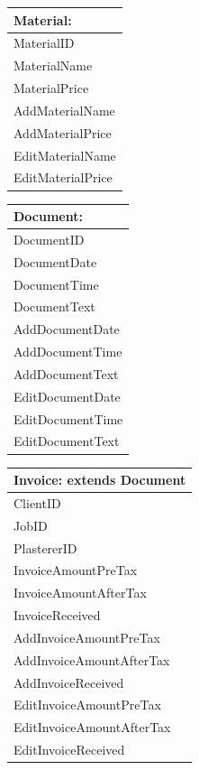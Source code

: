 \begin{tabular}{|p{5cm}|}
	\hline
	\textbf{Material:} \\ \hline
		MaterialID \\
		MaterialName \\
		MaterialPrice \\ \hline
		AddMaterialName\\
		AddMaterialPrice \\ \hline	
		EditMaterialName \\
		EditMaterialPrice \\ \hline
\end{tabular}

\begin{tabular}{|p{5cm}|}
	\hline
	\textbf{Document:} \\ \hline
		DocumentID \\
		DocumentDate \\
		DocumentTime \\
		DocumentText \\ \hline
		AddDocumentDate \\
		AddDocumentTime \\
		AddDocumentText \\
		EditDocumentDate \\
		EditDocumentTime \\
		EditDocumentText \\ \hline
		
\end{tabular}


\begin{tabular}{|p{5cm}|}
	\hline
	\textbf{Invoice:} extends \textbf{Document} \\ \hline
		ClientID \\
		JobID \\
		PlastererID\\
		InvoiceAmountPreTax \\
		InvoiceAmountAfterTax \\
		InvoiceReceived \\ \hline
		AddInvoiceAmountPreTax \\ 
		AddInvoiceAmountAfterTax \\
		AddInvoiceReceived \\
		EditInvoiceAmountPreTax \\ 
		EditInvoiceAmountAfterTax \\
		EditInvoiceReceived \\ \hline
		
\end{tabular}

